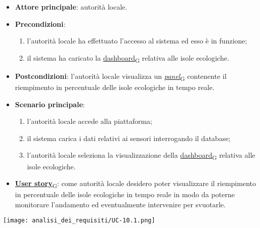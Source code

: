 \begin{itemize}
	\item \textbf{Attore principale}: autorità locale.
	\item \textbf{Precondizioni}:
	      \begin{enumerate}
		      \item l'autorità locale ha effettuato l'accesso al sistema ed esso è in funzione;
		      \item il sistema ha caricato la \href{https://7last.github.io/docs/rtb/documentazione-interna/glossario\#dashboard}{dashboard\textsubscript{G}} relativa alle isole ecologiche.
	      \end{enumerate}
	\item \textbf{Postcondizioni}: l'autorità locale visualizza un \href{https://7last.github.io/docs/rtb/documentazione-interna/glossario\#panel}{\textit{panel}\textsubscript{G}} contenente il riempimento in percentuale delle isole ecologiche in tempo reale.
	\item \textbf{Scenario principale}:
	      \begin{enumerate}
		      \item l'autorità locale accede alla piattaforma;
		      \item il sistema carica i dati relativi ai sensori interrogando il database;
		      \item l'autorità locale seleziona la visualizzazione della \href{https://7last.github.io/docs/rtb/documentazione-interna/glossario\#dashboard}{dashboard\textsubscript{G}} relativa alle isole ecologiche.
	      \end{enumerate}
	\item \href{https://7last.github.io/docs/rtb/documentazione-interna/glossario\#user-story}{\textbf{User story}\textsubscript{G}}:
	      come autorità locale desidero poter visualizzare il riempimento in percentuale delle isole ecologiche in tempo reale in modo da poterne monitorare l'andamento
	      ed eventualmente intervenire per svuotarle.
\end{itemize}
\begin{center}
	\texttt{[image: analisi\_dei\_requisiti/UC-10.1.png]}
\end{center}


